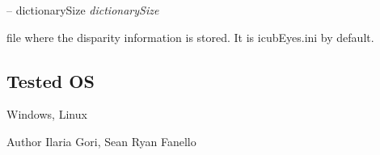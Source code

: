 -- dictionary\+Size {\itshape dictionary\+Size} 
\begin{DoxyItemize}
\item file where the disparity information is stored. It is icub\+Eyes.\+ini by default.
\end{DoxyItemize}\hypertarget{group__gestureRecognitionStereo_tested_os_sec}{}\subsection{Tested OS}\label{group__gestureRecognitionStereo_tested_os_sec}
Windows, Linux

\begin{DoxyAuthor}{Author}
Ilaria Gori, Sean Ryan Fanello 
\end{DoxyAuthor}
